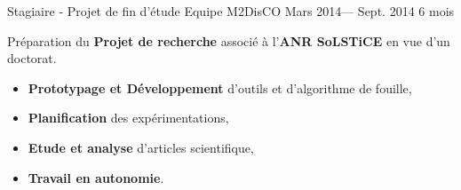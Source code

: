 \jobposition%
{Stagiaire - Projet de fin d'étude}%
{Equipe M2DisCO}
{Mars 2014--- Sept. 2014}%
{6 mois}%
{
	Préparation du \textbf{Projet de recherche} associé à l'\textbf{ANR SoLSTiCE}
	en vue d'un doctorat.
	\vspace{0.5em}
	\begin{itemize}
		\item \textbf{Prototypage et Développement} d’outils et d’algorithme de fouille,
		\item \textbf{Planification} des expérimentations,
		\item \textbf{Etude et analyse} d'articles scientifique,
		\item \textbf{Travail en autonomie}.
	\end{itemize}
	\vspace{0.5em}
}
